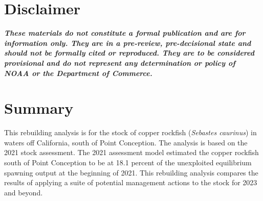 \documentclass[11pt,
  english,
  a4paper,
]{article}
\begin{document}
\newcommand{\lt}{\ensuremath <}
\newcommand{\gt}{\ensuremath >}

\pagebreak
{}
\setcounter{page}{1}

\renewcommand{\thetable}{\roman{table}}
\renewcommand{\thefigure}{\roman{figure}}

\setlength\parskip{0.5em plus 0.1em minus 0.2em}

\vspace{500cm}


\hypertarget{disclaimer}{%
\section*{Disclaimer}\label{disclaimer}}

\leavevmode\tagmcend\tagstructend


\emph{\textbf{These materials do not constitute a formal publication and are for information only. They are in a pre-review, pre-decisional state and should not be formally cited or reproduced. They are to be considered provisional and do not represent any determination or policy of NOAA or the Department of Commerce.}}

\leavevmode\tagmcend\tagstructend\par

\pagebreak


\hypertarget{summary}{%
\section*{Summary}\label{summary}}

\leavevmode\tagmcend\tagstructend


This rebuilding analysis is for the stock of copper rockfish (\emph{Sebastes caurinus}) in waters off California, south of Point Conception. The analysis is based on the 2021 stock assessment. The 2021 assessment model estimated the copper rockfish south of Point Conception to be at 18.1 percent of the unexploited equilibrium spawning output at the beginning of 2021. This rebuilding analysis compares the results of applying a suite of potential management actions to the stock for 2023 and beyond.
\end{document}
